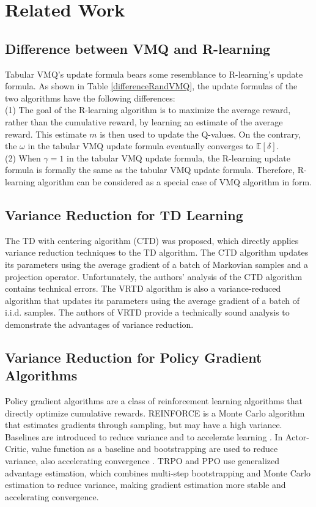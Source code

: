 \section{Related Work}
\subsection{Difference between VMQ and R-learning}
Tabular VMQ's update formula bears some resemblance 
to R-learning's update formula. As shown in Table \ref{differenceRandVMQ}, the update formulas of the two algorithms have the following differences:
\\(1) The goal of the R-learning algorithm \cite{schwartz1993reinforcement} is to maximize the average 
reward, rather than the cumulative reward, by learning an estimate 
of the average reward. This estimate $m$ is then used to update the Q-values.
On the contrary, the $\omega$ in the tabular VMQ update formula eventually converges to $\mathbb{E}[\delta]$.
\\(2) When $\gamma=1$ in the tabular VMQ update formula, the 
R-learning update formula is formally 
the same as the tabular VMQ update formula. 
Therefore, R-learning algorithm can be 
considered as a special case of VMQ algorithm in form.

\subsection{Variance Reduction for TD Learning}
 The TD with centering algorithm (CTD) \cite{korda2015td} 
was proposed, which directly applies variance reduction techniques to 
the TD algorithm. The CTD algorithm updates its parameters using the 
average gradient of a batch of Markovian samples and a projection operator. 
Unfortunately, the authors’ analysis of the CTD algorithm contains technical 
errors. The VRTD algorithm \cite{xu2020reanalysis} is also a variance-reduced algorithm that updates 
its parameters using the average gradient of a batch of i.i.d. samples. The 
authors of VRTD provide a technically sound analysis to demonstrate the 
advantages of variance reduction. 

\subsection{Variance Reduction for Policy Gradient Algorithms}
Policy gradient algorithms are a class of reinforcement 
learning algorithms that directly optimize cumulative rewards. 
REINFORCE  is a Monte Carlo algorithm that estimates 
gradients through sampling, but may have a high variance. 
Baselines are introduced to reduce variance and to
accelerate learning \cite{Sutton2018book}. In  Actor-Critic, 
value function as a baseline and bootstrapping 
 are used to reduce variance, also accelerating convergence \cite{Sutton2018book}.
 TRPO \cite{schulman2015trust} and PPO \cite{schulman2017proximal}
  use generalized advantage 
estimation, which combines multi-step bootstrapping and Monte Carlo 
estimation to reduce variance, making gradient estimation more stable and 
accelerating convergence. 

